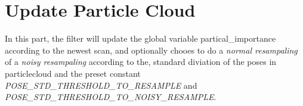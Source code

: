 \documentclass[11pt,a4paper]{article}
\begin{document}
  \section{Update Particle Cloud}
  In this part, the filter will update the global variable partical\_importance according to the newest scan, 
  and optionally chooes to do a \textit{normal resampaling} of a \textit{noisy resampaling} according to the,
  standard diviation of the poses in particlecloud and the preset constant \textit{POSE\_STD\_THRESHOLD\_TO\_RESAMPLE} 
  and \textit{POSE\_STD\_THRESHOLD\_TO\_NOISY\_RESAMPLE}.

\end{document}
